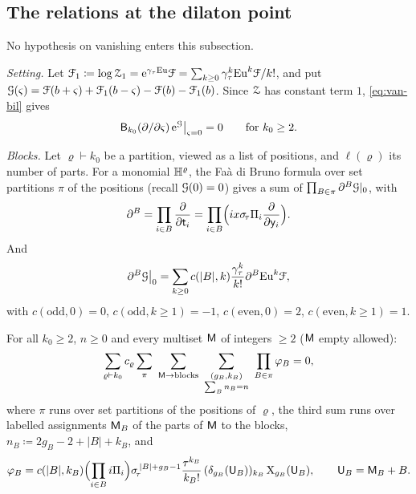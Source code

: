 \subsection{The relations at the dilaton point}
\label{sec:van-Mk}

No hypothesis on vanishing enters this subsection.

\emph{Setting.} Let $\mathcal{F}_1\coloneqq\log\mathcal{Z}_1=\mathrm{e}^{\gamma_\tau\mathrm{Eu}}\mathcal{F}=\sum_{k\geq 0}\gamma_\tau^k\mathrm{Eu}^k\mathcal{F}/k!$, and put $\mathcal{G}(\varsigma)=\mathcal{F}(b+\varsigma)+\mathcal{F}_1(b-\varsigma)-\mathcal{F}(b)-\mathcal{F}_1(b)$. Since $\mathcal{Z}$ has constant term $1$, \eqref{eq:van-bil} gives
\begin{equation}\label{eq:van-exp}
\mathsf{B}_{k_0}(\partial/\partial\varsigma)\,\mathrm{e}^{\mathcal{G}}\big|_{\varsigma=0}=0\qquad\text{for }k_0\geq 2.
\end{equation}

\emph{Blocks.} Let $\varrho\vdash k_0$ be a partition, viewed as a list of positions, and $\ell(\varrho)$ its number of parts. For a monomial $\mathbb{H}^\varrho$, the Fa\`a di Bruno formula over set partitions $\pi$ of the positions (recall $\mathcal{G}(0)=0$) gives a sum of $\prod_{B\in\pi}\partial^B\mathcal{G}|_0$, with
\[
\partial^B=\prod_{i\in B}\frac{\partial}{\partial\mathsf{t}_i}=\prod_{i\in B}\Bigl(ix\sigma_{\!\tau}\Pi_i\frac{\partial}{\partial\mathsf{y}_i}\Bigr).
\]
And
\[
\partial^B\mathcal{G}\big|_0=\sum_{k\geq 0}c(\lvert B\rvert,k)\frac{\gamma_\tau^k}{k!}\partial^B\mathrm{Eu}^k\mathcal{F},
\]
with $c(\mathrm{odd},0)=0$, $c(\mathrm{odd},k\geq 1)=-1$, $c(\mathrm{even},0)=2$, $c(\mathrm{even},k\geq 1)=1$.

\begin{thm}\label{thm:van-Mk}
For all $k_0\geq 2$, $n\geq 0$ and every multiset $\mathsf{M}$ of integers $\geq 2$ ($\mathsf{M}$ empty allowed):
\begin{equation}\label{eq:van-Mk}
\sum_{\varrho\vdash k_0}c_\varrho\sum_{\pi}\ \sum_{\msM\to\text{blocks}}\ \sum_{\substack{(g_B,k_B)\\\sum_Bn_B=n}}\ \prod_{B\in\pi}\varphi_B=0,
\end{equation}
where $\pi$ runs over set partitions of the positions of $\varrho$, the third sum runs over labelled assignments $\mathsf{M}_B$ of the parts of $\mathsf{M}$ to the blocks, $n_B\coloneqq2g_B-2+\lvert B\rvert+k_B$, and
\[
\varphi_B=c(\lvert B\rvert,k_B)\Bigl(\prod_{i\in B}i\Pi_i\Bigr)\sigma_{\!\tau}^{\,\lvert B\rvert+g_B-1}\frac{\tau^{k_B}}{k_B!}\,(\delta_{g_B}(\mathsf{U}_B))_{k_B}\,\mathrm{X}_{g_B}(\mathsf{U}_B),\qquad\mathsf{U}_B=\mathsf{M}_B+B.
\]
\end{thm}

